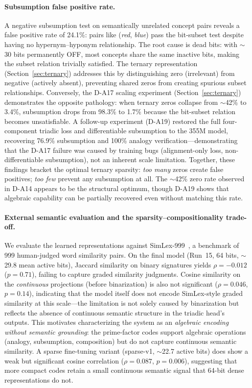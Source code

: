 \documentclass[11pt,a4paper]{article}
\begin{document}
\paragraph{Subsumption false positive rate.}
A negative subsumption test on semantically unrelated concept pairs reveals a false positive rate of 24.1\%: pairs like (\emph{red}, \emph{blue}) pass the bit-subset test despite having no hypernym--hyponym relationship. The root cause is dead bits: with $\sim$30 bits permanently OFF, most concepts share the same inactive bits, making the subset relation trivially satisfied. The ternary representation (Section~\ref{sec:ternary}) addresses this by distinguishing zero (irrelevant) from negative (actively absent), preventing shared zeros from creating spurious subset relationships. Conversely, the D-A17 scaling experiment (Section~\ref{sec:ternary}) demonstrates the opposite pathology: when ternary zeros collapse from $\sim$42\% to 3.4\%, subsumption drops from 98.3\% to 1.7\% because the bit-subset relation becomes unsatisfiable. A follow-up experiment (D-A19) restored the full four-component triadic loss and differentiable subsumption to the 355M model, recovering 76.9\% subsumption and 100\% analogy verification---demonstrating that the D-A17 failure was caused by training bugs (alignment-only loss, non-differentiable subsumption), not an inherent scale limitation. Together, these findings bracket the optimal ternary sparsity: \emph{too many} zeros create false positives; \emph{too few} prevent any subsumption at all. The $\sim$42\% zero rate observed in D-A14 appears to be the structural optimum, though D-A19 shows that algebraic capability can be partially recovered even without matching this rate.

\paragraph{External semantic evaluation and the sparsity--compositionality trade-off.}
We evaluate the learned representations against SimLex-999~\citep{hill2015simlex}, a benchmark of 999 human-judged word similarity pairs. On the final model (Run~15, 64 bits, $\sim$29.8 mean active bits), Jaccard similarity on binary signatures yields $\rho = -0.012$ ($p = 0.71$), failing to capture graded similarity judgments. Cosine similarity on the \emph{continuous} projections (before binarization) is also not significant ($\rho = 0.046$, $p = 0.14$), indicating that the model itself does not encode SimLex-style graded similarity at this scale---the limitation is not solely caused by binarization but reflects the absence of continuous semantic structure in the triadic head's outputs. This motivates characterizing the system as an \emph{algebraic encoding without semantic grounding}: the prime-factor codes support algebraic operations (analogy, subsumption, composition) but do not capture continuous semantic similarity. A sparse fine-tuning variant (sparse-v1, $\sim$22.7 active bits) does show a weak but significant cosine correlation ($\rho = 0.087$, $p = 0.006$), suggesting that more compact codes retain a small continuous semantic signal that 64-bit dense representations do not.
\end{document}
